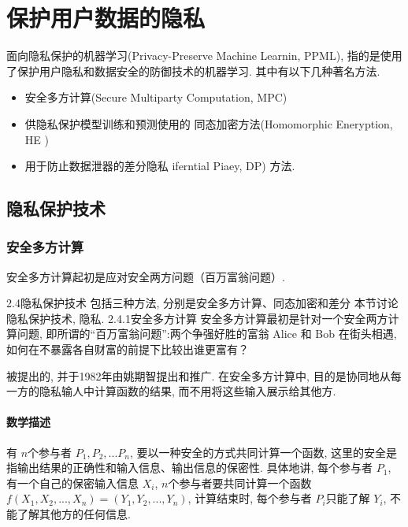 \documentclass[a4paper]{article}
\theoremstyle{definition}
\numberwithin{equation}{section}
\begin{document}


\section{保护用户数据的隐私}
 面向隐私保护的机器学习(Privacy-Preserve Machine Learnin, PPML), 指的是使用了保护用户隐私和数据安全的防御技术的机器学习. 其中有以下几种著名方法. \citep{ppmlmancuso}
 \begin{itemize}
     \item 
 安全多方计算(Secure Multiparty Computation,  MPC)
 \item 
 供隐私保护模型训练和预测使用的 同态加密方法(Homomorphic Eneryption,  HE )
 \item 
 用于防止数据泄器的差分隐私 iferntial Piaey, DP) 方法. 
 \end{itemize}
 
 \subsection{隐私保护技术}
 \subsubsection{安全多方计算}
 安全多方计算起初是应对安全两方问题（百万富翁问题）.  
  
2.4隐私保护技术
包括三种方法, 分别是安全多方计算、同态加密和差分
本节讨论隐私保护技术, 
隐私. 
2.4.1安全多方计算
安全多方计算最初是针对一个安全两方计算问题, 即所谓的“百万富翁问题”:两个争强好胜的富翁 Alice 和 Bob 在街头相遇, 如何在不暴露各自财富的前提下比较出谁更富有？\citep{scyao1982}

被提出的, 并于1982年由姚期智提出和推广. 在安全多方计算中, 目的是协同地从每一方的隐私输人中计算函数的结果, 而不用将这些输入展示给其他方. 
\paragraph{数学描述}
有 $n $个参与者 $P_1, P_2, ...P_n$, 要以一种安全的方式共同计算一个函数, 这里的安全是指输出结果的正确性和输入信息、输出信息的保密性. 具体地讲, 每个参与者 $P_1$, 有一个自己的保密输入信息 $X_i$, $n $个参与者要共同计算一个函数 $f(X_1, X_2, ... , X_n)=(Y_1, Y_2,  ... , Y_n)$,  计算结束时, 每个参与者 $P_i $只能了解 $Y_i$,  不能了解其他方的任何信息. 
\end{document}
